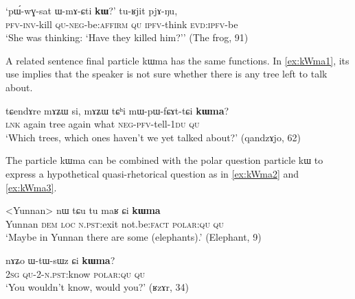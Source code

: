 \documentclass[oldfontcommands,oneside,a4paper,11pt]{article}
\newcommand{\ipa}[1]{{\phon #1}} %
\begin{document}
  \begin{exe} 
 \ex \label{ex:pWwGsat}
\gll 
`\ipa{pɯ́-wɣ-sat} 	\ipa{ɯ-mɤ-ɕti} 	\ipa{\textbf{kɯ}?}' 	\ipa{tu-ʁjit} 	\ipa{pjɤ-ŋu,} \\
\textsc{pfv-inv}-kill \textsc{qu-neg}-be:\textsc{affirm} \textsc{qu} \textsc{ipfv}-think \textsc{evd:ipfv}-be \\
\glt `She was thinking: `Have they killed him?'' (The frog, 91)
 \end{exe}  
 
 A related sentence final particle \ipa{kɯma} has the same functions. In  \ref{ex:kWma1}, its use implies that   the speaker is not sure whether there is any tree left to talk about.
   \begin{exe} 
 \ex \label{ex:kWma1}
\gll 
 \ipa{tɕendɤre} 	\ipa{mɤʑɯ} 	\ipa{si,} 	\ipa{mɤʑɯ} 	\ipa{tɕʰi} 	\ipa{mɯ-pɯ-fɕɤt-tɕi} 	\ipa{\textbf{kɯma}?} \\
\textsc{lnk} again tree again what \textsc{neg-pfv}-tell-\textsc{1du} \textsc{qu} \\
\glt `Which trees, which ones haven't we yet talked about?'  (\ipa{qandzɤjo}, 62)
  \end{exe} 
  
  The particle \ipa{kɯma} can be combined with the polar question particle \ipa{kɯ} to express a hypothetical quasi-rhetorical question as in \ref{ex:kWma2} and \ref{ex:kWma3}.      
  
     \begin{exe} 
 \ex \label{ex:kWma2}
\gll 
 <Yunnan> \ipa{nɯ} 	\ipa{tɕu} 	\ipa{tu} 	\ipa{maʁ} 	\ipa{ɕi} 	\ipa{\textbf{kɯma}} \\
 Yunnan \textsc{dem} \textsc{loc} \textsc{n.pst:}exit not.be:\textsc{fact} \textsc{polar:qu} \textsc{qu} \\
\glt  `Maybe in Yunnan there are some (elephants).' (Elephant, 9)
   \end{exe}
   
        \begin{exe} 
 \ex \label{ex:kWma3}
\gll 
 \ipa{nɤʑo} 	\ipa{ɯ-tɯ-sɯz} 	\ipa{ɕi} 	\ipa{\textbf{kɯma}?}  \\
 \textsc{2sg} \textsc{qu-2-n.pst}:know \textsc{polar:qu} \textsc{qu} \\
\glt `You wouldn't know, would you?' (ʁzɤr, 34)
    \end{exe}
    
\end{document}
